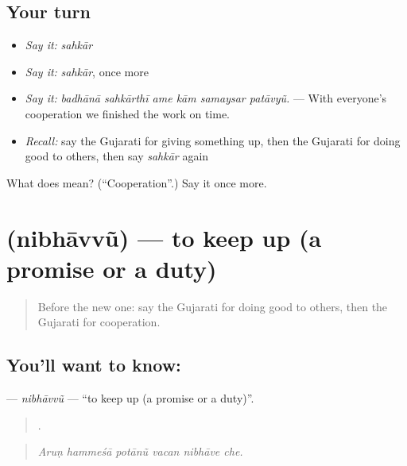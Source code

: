 \subsection*{Your turn}
\begin{itemize}
\raggedright
  \item \emph{Say it:} \emph{sahkār}
  \item \emph{Say it:} \emph{sahkār}, once more
  \item \emph{Say it:} \emph{badhānā sahkārthī ame kām samaysar patāvyũ.} — With everyone's cooperation we finished the work on time.
  \item \emph{Recall:} say the Gujarati for giving something up, then the Gujarati for doing good to others, then say \emph{sahkār} again
\end{itemize}

\begin{tcolorbox}[breakable,colback=teal!4,colframe=teal!35!black,title={Before you move on}]
What does  mean? (\textquotedblleft{}Cooperation\textquotedblright{}.) Say it once more.
\end{tcolorbox}
\section[\texorpdfstring{\gu{નિભાવવું} (nibhāvvũ)}{નિભાવવું (nibhāvvũ)}]{ (nibhāvvũ) — to keep up (a promise or a duty)}

\label{lesson:GU-C358-nibhavvu}



\begin{quote}
Before the new one: say the Gujarati for doing good to others, then the Gujarati for cooperation.
\end{quote}

\subsection*{You'll want to know: }
\textbf{} — \emph{nibhāvvũ} — \textquotedblleft{}to keep up (a promise or a duty)\textquotedblright{}.

\begin{quote}
     .
\end{quote}

\begin{quote}
\emph{Aruṇ hammeśā potānũ vacan nibhāve che.}
\end{quote}

